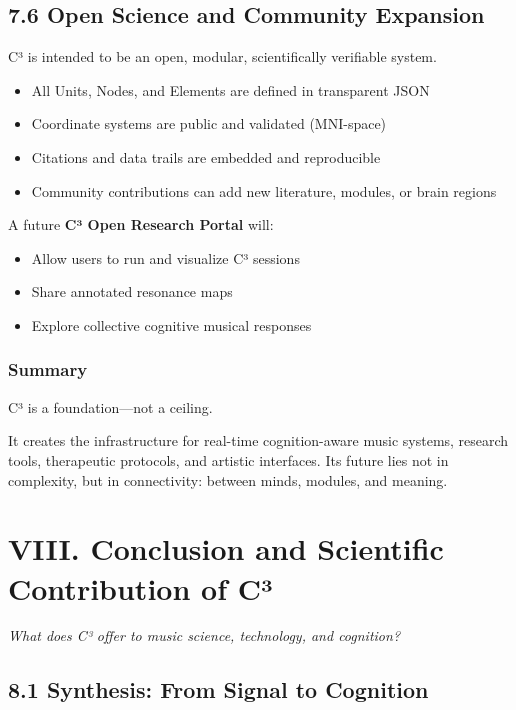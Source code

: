 \subsection*{7.6 Open Science and Community Expansion}

C³ is intended to be an open, modular, scientifically verifiable system.

\begin{itemize}
    \item All Units, Nodes, and Elements are defined in transparent JSON
    \item Coordinate systems are public and validated (MNI-space)
    \item Citations and data trails are embedded and reproducible
    \item Community contributions can add new literature, modules, or brain regions
\end{itemize}

A future \textbf{C³ Open Research Portal} will:

\begin{itemize}
    \item Allow users to run and visualize C³ sessions
    \item Share annotated resonance maps
    \item Explore collective cognitive musical responses
\end{itemize}

\subsubsection*{Summary}

C³ is a foundation—not a ceiling.

It creates the infrastructure for real-time cognition-aware music systems, research tools, therapeutic protocols, and artistic interfaces. Its future lies not in complexity, but in connectivity: between minds, modules, and meaning.

\section*{VIII. Conclusion and Scientific Contribution of C³}

\textit{What does C³ offer to music science, technology, and cognition?}

\subsection*{8.1 Synthesis: From Signal to Cognition}

